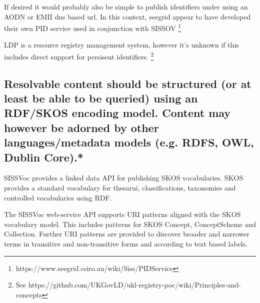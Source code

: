 \documentclass[10pt,a4paper]{article}
\begin{document}
\begin{flushleft}
  \item[]If desired it would probably also be simple to publish identifiers under using an
  AODN or EMII dns based url. In this context, seegrid appear to have developed their own
  PID service used in conjunction with SISSOV  \footnote{
  https://www.seegrid.csiro.au/wiki/Siss/PIDService}  
  
  \item[]LDP is a resource registry management system, however it's unknown 
  if this includes direct support for persisent identifiers.
    \footnote{ See 
    https://github.com/UKGovLD/ukl-registry-poc/wiki/Principles-and-concepts
  }


% 


% 
%   
% 
% 
% 


\subsection{Resolvable content should be structured (or at least be able to be queried)
  using an RDF/SKOS encoding model. Content may however be adorned by other
  languages/metadata models (e.g. RDFS, OWL, Dublin Core).* }

  SISSVoc provides a linked data API for publishing SKOS vocabularies.  SKOS
provides a standard vocabulary for thesarui, classifications, taxonomies and
controlled vocabularies using RDF.

  The SISSVoc web-service API supports URI patterns aligned with the SKOS
vocabulary model. This includes patterns for SKOS Concept,
ConceptScheme and Collection. Further URI patterns are provided to discover
broader and narrower terms in transitive and non-transitive forms and according
to text based labels. 


\end{flushleft}
\end{document}
